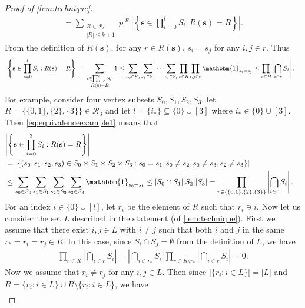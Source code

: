 \documentclass[letterpaper,11pt]{article}
\newcommand{\Vsize}{N}
\begin{document}
\begin{proof}[Proof of \cref{lem:technique}]
\begin{align}
=\sum_{\substack{R\in \mathcal{R}_{l}:\\|R|\leq k+1}}p^{|R|}\left|\left\{\mathbf{s}\in \prod_{i=0}^l S_i: R(\mathbf{s})=R\right\}\right|. \label{eqn:C2_2}
\end{align}
From the definition of $R(\mathbf{s})$, for any $r \in R(\mathbf{s})$, $s_i=s_j$ for any $i,j \in r$.
Thus
\begin{align}
\left|\left\{\mathbf{s}\in \prod_{i=0}^l S_i: R(\mathbf{s})=R\right\}\right|
&= \sum_{\substack{\mathbf{s}\in \prod_{i=0}^l S_i:\\ R(\mathbf{s})=R}}1
\leq \sum_{s_0\in S_0}\sum_{s_1\in S_1}\cdots \sum_{s_l\in S_l}\prod_{r\in R} \prod_{i,j\in r}\mathbbm{1}_{s_i=s_j}
\leq \prod_{r\in R}\left|\bigcap_{i\in r}S_i\right|.
\label{eq:equivalenceexample1}
\end{align}
For example, 
consider four vertex subsets $S_0, S_1, S_2, S_3$, let $R=\bigl\{ \{0,1\},\{2\},\{3\} \bigr\}\in \mathcal{R}_3$ and let $l=\{i_*\}\subseteq \{0\}\cup [3]$ where $i_*\in \{0\}\cup [3]$.
Then \cref{eq:equivalenceexample1} means that
\begin{align*}
\lefteqn{
\left|\left\{\mathbf{s}\in \prod_{i=0}^3 S_i: R(\mathbf{s})=R\right\}\right|}\\
&=\left|\left\{(s_0,s_1,s_2,s_3)\in S_0\times S_1\times S_2\times S_3: s_0=s_1, s_0\neq s_2, s_0\neq s_3, s_2\neq s_3\right\}\right|\\
&\leq \sum_{s_0\in S_0}\sum_{s_1\in S_1}\sum_{s_2\in S_2}\sum_{s_3\in S_3}\mathbbm{1}_{s_0=s_1}\leq |S_0\cap S_1||S_2||S_3|
=\prod_{r\in \{ \{0,1\},\{2\},\{3\} \}}\left|\bigcap_{i\in r}S_i\right|.
\end{align*}
%
For an index $i\in \{0\}\cup [l]$, let $r_i$ be the element of $R$ such that $r_i\ni i$.
Now let us consider the set $L$ described in the statement (of \cref{lem:technique}).
First we assume that there exist $i,j\in L$ with $i\neq j$ such that both $i$ and $j$ in the same $r_*=r_i=r_j\in R$.
In this case, since $S_i\cap S_j=\emptyset$ from the definition of $L$, we have
\begin{align}
\prod_{r\in R}\left|\bigcap_{i\in r}S_i\right|=\left|\bigcap_{i\in r_*}S_i\right|\prod_{r\in R\setminus r_*}\left|\bigcap_{i\in r}S_i\right|=0. \label{eqn:C2_4}
\end{align}
Now we assume that $r_i\neq r_j$ for any $i, j\in L$.
Then since $|\{r_i: i\in L\}|=|L|$ and $R=\{r_i: i\in L\} \cup R\setminus \{r_i: i\in L\}$, we have
\begin{align}

\end{align}
\end{proof}
\end{document}
